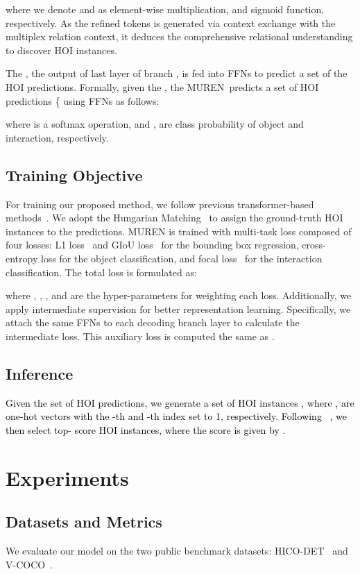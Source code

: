 \documentclass[10pt,twocolumn,letterpaper]{article}
\newcommand{\sh}[1]{\textcolor{black}{#1}}
\begin{document}
where we denote  and  as element-wise multiplication, and sigmoid function, respectively.
As the refined tokens  is generated via context exchange with the multiplex relation context, it deduces the comprehensive relational understanding to discover HOI instances.


The , the output of last layer of branch , is fed into FFNs to predict a set of the HOI predictions.
Formally, given the , the MUREN~predicts a set of HOI predictions \{ using FFNs as follows:

where  is a softmax operation, and ,  are class probability of object and interaction, respectively. 
\subsection{Training Objective}
For training our proposed method, we follow previous transformer-based methods~\cite{tamura2021qpic,zhang2021cdn,zhou2022distr}. 
We adopt the Hungarian Matching~\cite{kuhn1955hungarian} to assign the ground-truth HOI instances to the predictions.
MUREN is trained with multi-task loss composed of four losses: L1 loss~\cite{ren2015faster}  and GIoU loss~\cite{rezatofighi2019generalized}  for the bounding box regression, cross-entropy loss  for the object classification, and focal loss~\cite{lin2017focal}  for the interaction classification. 
The total loss  is formulated as:

where , , , and  are the hyper-parameters for weighting each loss.
Additionally, we apply intermediate supervision for better representation learning.
Specifically, we attach the same FFNs to each decoding branch layer to calculate the intermediate loss.
This auxiliary loss is computed the same as .




\subsection{Inference}
 \sh{Given the set of HOI predictions, we generate a set of HOI instances , where ,  are one-hot vectors with the -th and -th index set to 1, respectively. Following ~\cite{zhang2021cdn}, we then select top- score HOI instances, where the score is given by .} 

 \section{Experiments}
\subsection{Datasets and Metrics}
We evaluate our model on the two public benchmark datasets: HICO-DET~\cite{hico} and V-COCO~\cite{vcoco}. 
\end{document}
